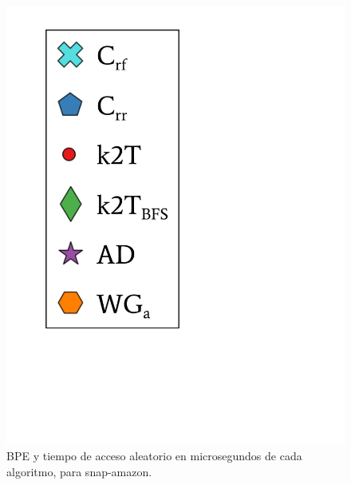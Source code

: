 \begin{frame}
\begin{figure}
\begin{minipage}{1\textwidth}
\begin{minipage}{0.15\textwidth}
    			\includegraphics[scale=.16, clip, trim=70 200 280 40]{../img/bpeTimes/labelAle.pdf}
    		\end{minipage}	
    	\end{minipage}

	\caption{BPE y tiempo de acceso aleatorio en microsegundos de cada algoritmo, para snap-amazon.}
\end{figure}

\end{frame}

